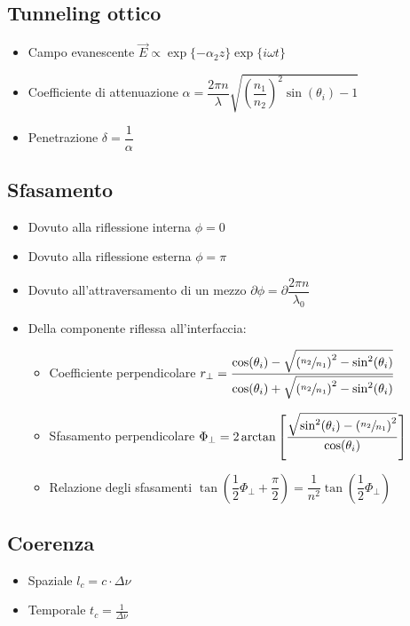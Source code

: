 \documentclass{article}
\begin{document}
\subsection{Tunneling ottico}
\begin{itemize}
  \item Campo evanescente \( \vec{E} \propto \exp{\{-\alpha_2 z\}} \exp{\{ i \omega t \}} \)
  \item Coefficiente di attenuazione \( \alpha = \dfrac{2 \pi n}{\lambda} \sqrt{ \left( \dfrac{n_1}{n_2} \right) ^ 2 \sin(\theta_i) - 1} \)
  \item Penetrazione \( \delta = \dfrac{1}{\alpha} \)
\end{itemize}

\subsection{Sfasamento}
\begin{itemize}
  \item Dovuto alla riflessione interna \( \phi = 0 \)
  \item Dovuto alla riflessione esterna \( \phi = \pi \)
  \item Dovuto all'attraversamento di un mezzo \( \partial \phi = \partial \dfrac{2 \pi n}{\lambda_0} \)
  \item Della componente riflessa all'interfaccia:
        \begin{itemize}
          \item Coefficiente perpendicolare \( r_\perp = \dfrac{\cos(\theta_i) - \sqrt{\left( \sfrac{n_2}{n_1} \right) ^ 2 - \sin^2(\theta_i)}}{\cos(\theta_i) + \sqrt{\left( \sfrac{n_2}{n_1} \right) ^ 2 - \sin^2(\theta_i)}} \)
          \item Sfasamento perpendicolare \( \Phi_\perp = 2 \arctan \left[ \dfrac{ \sqrt{\sin^2(\theta_i) - \left( \sfrac{n_2}{n_1} \right) ^ 2 } }{ \cos(\theta_i) } \right] \)
          \item Relazione degli sfasamenti \( \tan \left( \dfrac{1}{2} \Phi_\perp + \dfrac{\pi}{2} \right) = \dfrac{1}{n ^ 2} \tan \left( \dfrac{1}{2} \Phi_\perp \right) \)
        \end{itemize}
\end{itemize}

\subsection{Coerenza}
\begin{itemize}
  \item Spaziale \( l_c = c \cdot \Delta \nu \)
  \item Temporale \( t_c = \frac{1}{\Delta \nu} \)
\end{itemize}
\end{document}
